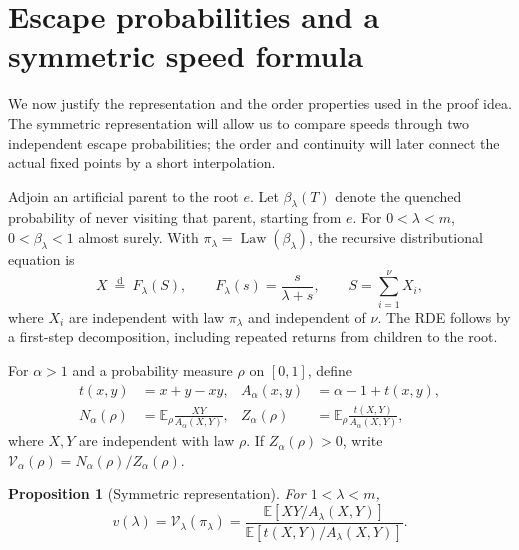 \documentclass[11pt,a4paper]{article}
\numberwithin{equation}{section}
\theoremstyle{notethm}
\newtheorem{proposition}[proposition]{Proposition}
\theoremstyle{definition}
\newcommand{\E}{\mathbb E}
\newcommand{\Law}{\operatorname{Law}}
\begin{document}
\section{Escape probabilities and a symmetric speed formula}\label{sec:reduction}

We now justify the representation and the order properties used in the
proof idea. The symmetric representation will allow us to compare speeds
through two independent escape probabilities; the order and continuity
will later connect the actual fixed points by a short interpolation.

Adjoin an artificial parent to the root $e$. Let $\beta_\lambda(T)$ denote the
quenched probability of never visiting that parent, starting from $e$.
For $0<\lambda<m$, $0<\beta_\lambda<1$ almost surely. With
$\pi_\lambda=\Law(\beta_\lambda)$, the recursive distributional equation is
\begin{equation}\label{eq:rde}
 X\ \overset{\mathrm d}=\ F_\lambda(S),\qquad
 F_\lambda(s)=\frac{s}{\lambda+s},\qquad
 S=\sum_{i=1}^{\nu}X_i,
\end{equation}
where $X_i$ are independent with law $\pi_\lambda$ and independent of $\nu$.
The RDE follows by a first-step decomposition, including repeated returns
from children to the root.

For $\alpha>1$ and a probability measure $\rho$ on $[0,1]$, define
\begin{align}
 t(x,y)&=x+y-xy,
 & A_\alpha(x,y)&=\alpha-1+t(x,y),\label{eq:kernels}\\
 N_\alpha(\rho)&=\E_\rho\frac{XY}{A_\alpha(X,Y)},
 & Z_\alpha(\rho)&=\E_\rho\frac{t(X,Y)}{A_\alpha(X,Y)},\label{eq:NZ}
\end{align}
where $X,Y$ are independent with law $\rho$. If $Z_\alpha(\rho)>0$, write
$\mathcal V_\alpha(\rho)=N_\alpha(\rho)/Z_\alpha(\rho)$.

\begin{proposition}[Symmetric representation]\label{prop:symmetric}
For $1<\lambda<m$,
\begin{equation}\label{eq:symmetric-speed}
 v(\lambda)=\mathcal V_\lambda(\pi_\lambda)
 =\frac{\E[XY/A_\lambda(X,Y)]}
       {\E[t(X,Y)/A_\lambda(X,Y)]}.
\end{equation}
\end{proposition}
\end{document}
